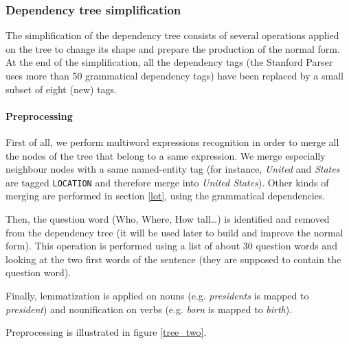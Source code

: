 
\subsubsection{Dependency tree simplification}
\label{dts}

The simplification of the dependency tree consists of several operations applied on the tree to change its shape and prepare the production of the normal form. At the end of the simplification, all the dependency tags (the Stanford Parser uses more than 50 grammatical dependency tags) have been replaced by a small subset of eight (new) tags.


\paragraph{Preprocessing}
\label{pre}

First of all, we perform multiword expressions recognition in order to merge all the nodes of the tree that belong to a same expression. We merge especially neighbour nodes with a same named-entity tag (for instance, \textit{United} and \textit{States} are tagged \texttt{LOCATION} and therefore merge into \textit{United States}). Other kinds of merging are performed in section \ref{lot}, using the grammatical dependencies.

Then, the question word (Who, Where, How tall\dots) is identified and removed from the dependency tree (it will be used later to build and improve the normal form). This operation is performed using a list of about 30 question words and looking at the two first words of the sentence (they are supposed to contain the question word).

Finally, lemmatization is applied on nouns (e.g. \textit{presidents} is mapped to \textit{president}) and nounification on verbs (e.g. \textit{born} is mapped to \textit{birth}).

Preprocessing is illustrated in figure \ref{tree_two}.

